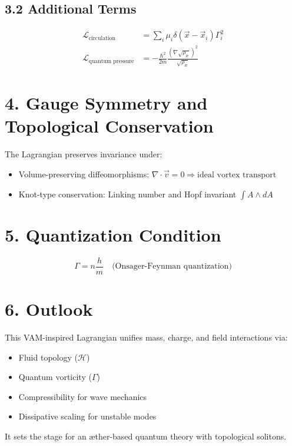 \documentclass[12pt]{article}
\begin{document}
\subsection*{3.2 Additional Terms}
\begin{align}
\mathcal{L}_\text{circulation} &= \sum_i \mu_i \delta(\vec{x} - \vec{x}_i) \Gamma_i^2 \\
\mathcal{L}_\text{quantum pressure} &= - \frac{\hbar^2}{2m} \frac{(\nabla \sqrt{\rho_\text{\ae}})^2}{\sqrt{\rho_\text{\ae}}}
\end{align}

\section*{4. Gauge Symmetry and Topological Conservation}
The Lagrangian preserves invariance under:
\begin{itemize}
    \item Volume-preserving diffeomorphisms: \( \nabla \cdot \vec{v} = 0 \Rightarrow \text{ideal vortex transport} \)
    \item Knot-type conservation: Linking number and Hopf invariant \( \int A \wedge dA \)
\end{itemize}

\section*{5. Quantization Condition}
\begin{equation}
\Gamma = n \frac{h}{m} \quad \text{(Onsager-Feynman quantization)}
\end{equation}

\section*{6. Outlook}
This VAM-inspired Lagrangian unifies mass, charge, and field interactions via:
\begin{itemize}
    \item Fluid topology (\( \mathcal{H} \))
    \item Quantum vorticity (\( \Gamma \))
    \item Compressibility for wave mechanics
    \item Dissipative scaling for unstable modes
\end{itemize}

It sets the stage for an æther-based quantum theory with topological solitons.
\end{document}
